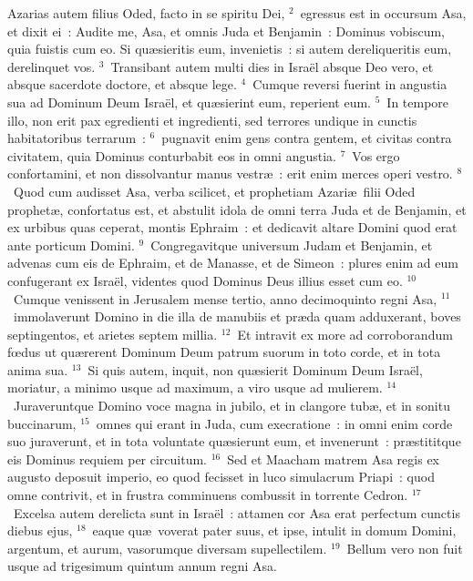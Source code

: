 \lettrine[lines=10,image=true,loversize=0.05,lraise=-0.03]{A}{}zarias autem filius Oded, facto in se spiritu Dei,
${}^{2}$~egressus est in occursum Asa, et dixit ei~: Audite me, Asa, et omnis Juda et Benjamin~: Dominus vobiscum, quia fuistis cum eo. Si qu\ae sieritis eum, invenietis~: si autem dereliqueritis eum, derelinquet vos.
${}^{3}$~Transibant autem multi dies in Isra\"el absque Deo vero, et absque sacerdote doctore, et absque lege.
${}^{4}$~Cumque reversi fuerint in angustia sua ad Dominum Deum Isra\"el, et qu\ae sierint eum, reperient eum.
${}^{5}$~In tempore illo, non erit pax egredienti et ingredienti, sed terrores undique in cunctis habitatoribus terrarum~:
${}^{6}$~pugnavit enim gens contra gentem, et civitas contra civitatem, quia Dominus conturbabit eos in omni angustia.
${}^{7}$~Vos ergo confortamini, et non dissolvantur manus vestr\ae~: erit enim merces operi vestro.
${}^{8}$~Quod cum audisset Asa, verba scilicet, et prophetiam Azari\ae\ filii Oded prophet\ae , confortatus est, et abstulit idola de omni terra Juda et de Benjamin, et ex urbibus quas ceperat, montis Ephraim~: et dedicavit altare Domini quod erat ante porticum Domini.
${}^{9}$~Congregavitque universum Judam et Benjamin, et advenas cum eis de Ephraim, et de Manasse, et de Simeon~: plures enim ad eum confugerant ex Isra\"el, videntes quod Dominus Deus illius esset cum eo.
${}^{10}$~Cumque venissent in Jerusalem mense tertio, anno decimoquinto regni Asa,
${}^{11}$~immolaverunt Domino in die illa de manubiis et pr\ae da quam adduxerant, boves septingentos, et arietes septem millia.
${}^{12}$~Et intravit ex more ad corroborandum fœdus ut qu\ae rerent Dominum Deum patrum suorum in toto corde, et in tota anima sua.
${}^{13}$~Si quis autem, inquit, non qu\ae sierit Dominum Deum Isra\"el, moriatur, a minimo usque ad maximum, a viro usque ad mulierem.
${}^{14}$~Juraveruntque Domino voce magna in jubilo, et in clangore tub\ae , et in sonitu buccinarum,
${}^{15}$~omnes qui erant in Juda, cum execratione~: in omni enim corde suo juraverunt, et in tota voluntate qu\ae sierunt eum, et invenerunt~: pr\ae stititque eis Dominus requiem per circuitum.
${}^{16}$~Sed et Maacham matrem Asa regis ex augusto deposuit imperio, eo quod fecisset in luco simulacrum Priapi~: quod omne contrivit, et in frustra comminuens combussit in torrente Cedron.
${}^{17}$~Excelsa autem derelicta sunt in Isra\"el~: attamen cor Asa erat perfectum cunctis diebus ejus,
${}^{18}$~eaque qu\ae\ voverat pater suus, et ipse, intulit in domum Domini, argentum, et aurum, vasorumque diversam supellectilem.
${}^{19}$~Bellum vero non fuit usque ad trigesimum quintum annum regni Asa.

